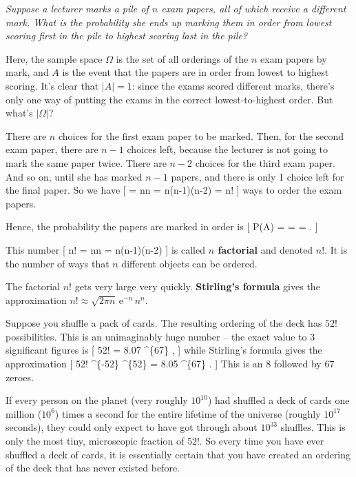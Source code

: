 \documentclass[
  letterpaper,
]{report}
\theoremstyle{definition}
\theoremstyle{definition}
\theoremstyle{remark}
\begin{document}
\emph{Suppose a lecturer marks a pile of \(n\) exam papers, all of which
receive a different mark. What is the probability she ends up marking
them in order from lowest scoring first in the pile to highest scoring
last in the pile?}

Here, the sample space \(\Omega\) is the set of all orderings of the
\(n\) exam papers by mark, and \(A\) is the event that the papers are in
order from lowest to highest scoring. It's clear that \(|A| = 1\): since
the exams scored different marks, there's only one way of putting the
exams in the correct lowest-to-highest order. But what's \(|\Omega|\)?

There are \(n\) choices for the first exam paper to be marked. Then, for
the second exam paper, there are \(n - 1\) choices left, because the
lecturer is not going to mark the same paper twice. There are \(n-2\)
choices for the third exam paper. And so on, until she has marked
\(n-1\) papers, and there is only 1 choice left for the final paper. So
we have {[} \textbar{}\Omega\textbar{} = \ff nn =
n(n-1)(n-2) = n! {]} ways to order the exam papers.

Hence, the probability the papers are marked in order is {[}
\mathbb P(A) =  =  =
 . {]}

This number {[} n! = \ff nn = n(n-1)(n-2) {]} is
called \textbf{\(n\) factorial} and denoted \(n!\). It is the number of
ways that \(n\) different objects can be ordered.

The factorial \(n!\) gets very large very quickly. \textbf{Stirling's
formula} gives the approximation
\(n! \approx \sqrt{2\pi n} \, \mathrm{e}^{-n} \, n^n\).

Suppose you shuffle a pack of cards. The resulting ordering of the deck
has \(52!\) possibilities. This is an unimaginably huge number -- the
exact value to 3 significant figures is {[} 52! = 8.07
\^{}\{67\} , {]} while Stirling's formula gives the
approximation {[} 52! \approx {}
\times {}\^{}\{-52\} \^{}\{52\} = 8.05
\^{}\{67\} . {]} This is an 8 followed by 67 zeroes.

If every person on the planet (very roughly \(10^{10}\)) had shuffled a
deck of cards one million (\(10^6\)) times a second for the entire
lifetime of the universe (roughly \(10^{17}\) seconds), they could only
expect to have got through about \(10^{33}\) shuffles. This is only the
most tiny, microscopic fraction of \(52!\). So every time you have ever
shuffled a deck of cards, it is essentially certain that you have
created an ordering of the deck that has never existed before.
\end{document}
